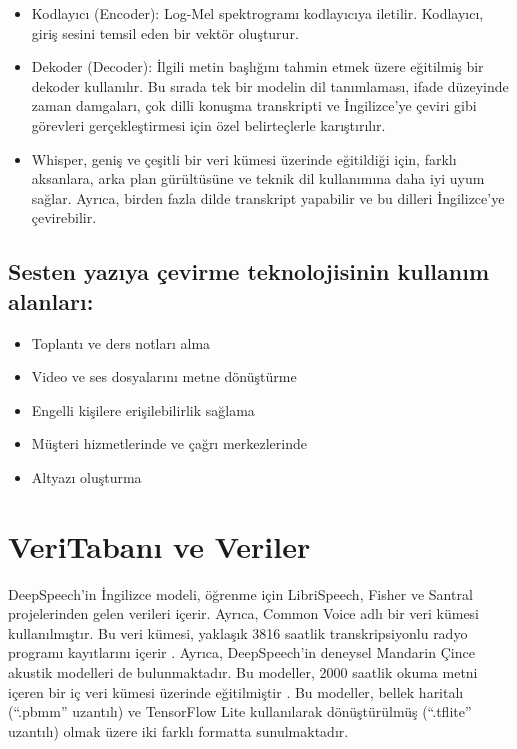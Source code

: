 \documentclass{article}
\begin{document}
\begin{itemize}
		\item Kodlayıcı (Encoder): Log-Mel spektrogramı kodlayıcıya iletilir. Kodlayıcı, giriş sesini temsil eden bir vektör oluşturur.
		\item Dekoder (Decoder): İlgili metin başlığını tahmin etmek üzere eğitilmiş bir dekoder kullanılır. Bu sırada tek bir modelin dil tanımlaması, ifade düzeyinde zaman damgaları, çok dilli konuşma transkripti ve İngilizce’ye çeviri gibi görevleri gerçekleştirmesi için özel belirteçlerle karıştırılır.
		\item Whisper, geniş ve çeşitli bir veri kümesi üzerinde eğitildiği için, farklı aksanlara, arka plan gürültüsüne ve teknik dil kullanımına daha iyi uyum sağlar. Ayrıca, birden fazla dilde transkript yapabilir ve bu dilleri İngilizce’ye çevirebilir.
	\end{itemize}
	

	\subsection{Sesten yazıya çevirme teknolojisinin kullanım alanları:}
	\begin{itemize}
		\item Toplantı ve ders notları alma
		\item Video ve ses dosyalarını metne dönüştürme
		\item Engelli kişilere erişilebilirlik sağlama
		\item Müşteri hizmetlerinde ve çağrı merkezlerinde
		\item Altyazı oluşturma
	\end{itemize}
	
	
	
	\section{VeriTabanı ve Veriler}
	DeepSpeech’in İngilizce modeli, öğrenme için LibriSpeech, Fisher ve Santral projelerinden gelen verileri içerir. Ayrıca, Common Voice adlı bir veri kümesi kullanılmıştır. Bu veri kümesi, yaklaşık 3816 saatlik transkripsiyonlu radyo programı kayıtlarını içerir \cite{DeepSpeechM}.
	Ayrıca, DeepSpeech’in deneysel Mandarin Çince akustik modelleri de bulunmaktadır. Bu modeller, 2000 saatlik okuma metni içeren bir iç veri kümesi üzerinde eğitilmiştir \cite{DeepSpeech}. Bu modeller, bellek haritalı (“.pbmm” uzantılı) ve TensorFlow Lite kullanılarak dönüştürülmüş (“.tflite” uzantılı) olmak üzere iki farklı formatta sunulmaktadır.\\
	
\end{document}
